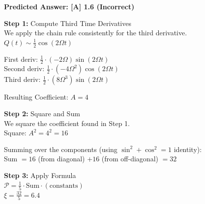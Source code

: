 \begin{minipage}{\linewidth}
\begin{tcolorbox}[
    title={\textbf{IPhO 2018 Q1}},
    colback=white,
    colframe=gray!50!black,
    arc=3pt,
    boxrule=1pt,
    fonttitle=\sffamily\large,
    width=\linewidth
]
\begin{minipage}[t]{0.49\linewidth}
\begin{tcolorbox}
            \textbf{Predicted Answer: [A] 1.6 (Incorrect)}
        \end{tcolorbox}
    \end{minipage}%
    \hfill
    \begin{minipage}[t]{0.49\linewidth}
        \vspace{0pt}
        \begin{tcolorbox}[
            title={\small \textbf{RL-FINETUNED MODEL}},
            colframe=green!50!black,
            colback=green!5!white,
            coltitle=white,
            fontupper=\small\ttfamily\raggedright,
            boxrule=0.5pt,
            sharp corners,
            left=2pt, right=2pt,
            width=\linewidth,
            nobeforeafter
        ]
            \textbf{\textcolor{green!40!black}{Step 1:}} Compute Third Time Derivatives\\
            We apply the chain rule consistently for the third derivative.\\
            $Q(t) \sim \frac{1}{2} \cos(2\Omega t)$
            \vspace{1em}
            
            First deriv:  $\frac{1}{2} \cdot (-2\Omega) \sin(2\Omega t)$\\
            Second deriv: $\frac{1}{2} \cdot (-4\Omega^2) \cos(2\Omega t)$\\
            Third deriv:  $\frac{1}{2} \cdot (8\Omega^3) \sin(2\Omega t)$
            \vspace{1em}
            
            Resulting Coefficient: $A = 4$
            \vspace{1em}
            
            \textbf{\textcolor{green!40!black}{Step 2:}} Square and Sum\\
            We square the coefficient found in Step 1.\\
            Square: $A^2 = 4^2 = 16$
            \vspace{0.5em}
            
            Summing over the components (using $\sin^2 + \cos^2 = 1$ identity):\\
            Sum $= 16$ (from diagonal) $+ 16$ (from off-diagonal) $= 32$
            \vspace{1em}
            
            \textbf{\textcolor{green!40!black}{Step 3:}} Apply Formula\\
            $\mathcal{P} = \frac{1}{5} \cdot \text{Sum} \cdot (\text{constants})$\\
            $\xi = \frac{32}{5} = 6.4$
            \vspace{1em}
            

\end{tcolorbox}
\end{minipage}
\end{tcolorbox}
\end{minipage}
